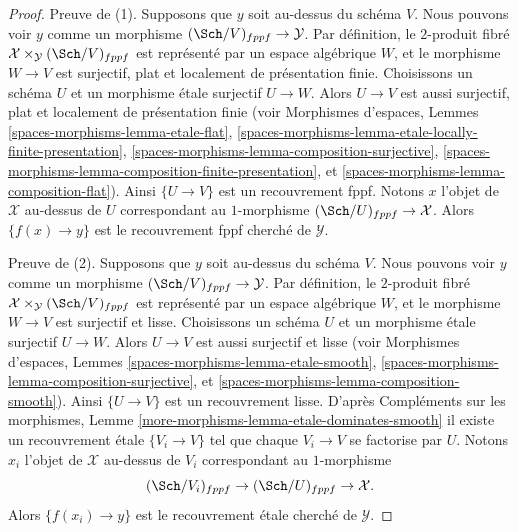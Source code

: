 \begin{proof}
Preuve de (1). Supposons que $y$ soit au-dessus du schéma $V$.
Nous pouvons voir $y$ comme un morphisme $(\Sch/V)_{fppf} \to \mathcal{Y}$.
Par définition, le $2$-produit fibré
$\mathcal{X} \times_\mathcal{Y} (\Sch/V)_{fppf}$
est représenté par un espace algébrique $W$, et le morphisme
$W \to V$ est surjectif, plat et localement de présentation finie.
Choisissons un schéma $U$ et un morphisme \'etale surjectif $U \to W$.
Alors $U \to V$ est aussi surjectif, plat et localement de présentation finie
(voir Morphismes d'espaces, Lemmes
\ref{spaces-morphisms-lemma-etale-flat},
\ref{spaces-morphisms-lemma-etale-locally-finite-presentation},
\ref{spaces-morphisms-lemma-composition-surjective},
\ref{spaces-morphisms-lemma-composition-finite-presentation}, et
\ref{spaces-morphisms-lemma-composition-flat}).
Ainsi $\{U \to V\}$ est un recouvrement fppf. Notons $x$ l'objet de
$\mathcal{X}$ au-dessus de $U$ correspondant au $1$-morphisme
$(\Sch/U)_{fppf} \to \mathcal{X}$. Alors $\{f(x) \to y\}$ est
le recouvrement fppf cherché de $\mathcal{Y}$.

\medskip\noindent
Preuve de (2). Supposons que $y$ soit au-dessus du schéma $V$.
Nous pouvons voir $y$ comme un morphisme $(\Sch/V)_{fppf} \to \mathcal{Y}$.
Par définition, le $2$-produit fibré
$\mathcal{X} \times_\mathcal{Y} (\Sch/V)_{fppf}$
est représenté par un espace algébrique $W$, et le morphisme
$W \to V$ est surjectif et lisse.
Choisissons un schéma $U$ et un morphisme \'etale surjectif $U \to W$.
Alors $U \to V$ est aussi surjectif et lisse
(voir Morphismes d'espaces, Lemmes
\ref{spaces-morphisms-lemma-etale-smooth},
\ref{spaces-morphisms-lemma-composition-surjective}, et
\ref{spaces-morphisms-lemma-composition-smooth}).
Ainsi $\{U \to V\}$ est un recouvrement lisse. D'après
Compléments sur les morphismes, Lemme \ref{more-morphisms-lemma-etale-dominates-smooth}
il existe un recouvrement \'etale $\{V_i \to V\}$ tel que
chaque $V_i \to V$ se factorise par $U$. Notons $x_i$ l'objet de
$\mathcal{X}$ au-dessus de $V_i$ correspondant au $1$-morphisme
$$
(\Sch/V_i)_{fppf} \to (\Sch/U)_{fppf} \to \mathcal{X}.
$$
Alors $\{f(x_i) \to y\}$ est
le recouvrement \'etale cherché de $\mathcal{Y}$.
\end{proof}

